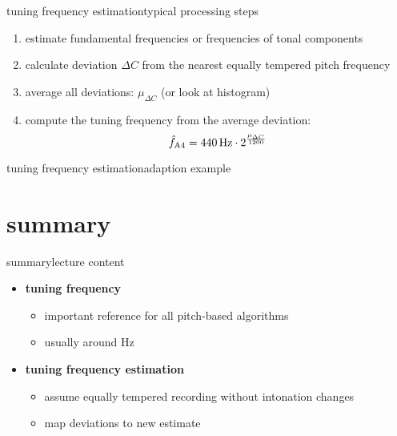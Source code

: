        \begin{frame}{tuning frequency estimation}{typical processing steps}
            \begin{enumerate}
                \item   estimate fundamental frequencies or frequencies of tonal components
                \item   calculate deviation $\Delta C$ from the nearest equally tempered pitch frequency
                \item   average all deviations: $\mu_{\Delta C}$ (or look at histogram)
                \item   compute the tuning frequency from the average deviation:
                \[ \hat{f}_\mathrm{A4} = \unit[440]{Hz}\cdot 2^\frac{\mu_{\Delta C}}{1200}\]
                    
            \end{enumerate}
       \end{frame}
       \begin{frame}{tuning frequency estimation}{adaption example}
            \vspace{-3mm}
            
       \end{frame}
     

    \section{summary}
        \begin{frame}{summary}{lecture content}
            \begin{itemize}
                \item   \textbf{tuning frequency}
                    \begin{itemize}
                        \item   important reference for all pitch-based algorithms
                        \item   usually around \unit[440]{Hz}
                    \end{itemize}
                \bigskip
                \item  \textbf{tuning frequency estimation}
                    \begin{itemize}
                        \item   assume equally tempered recording without intonation changes
                        \item   map deviations to new estimate
                    \end{itemize}
            \end{itemize}
        \end{frame}

